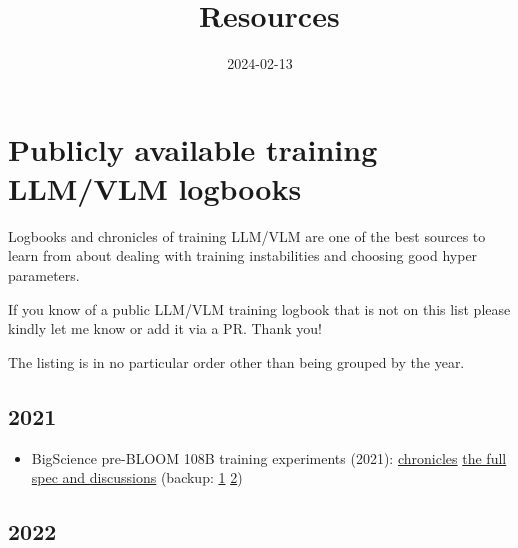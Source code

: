 \documentclass[
]{report}
\title{📓 Resources}
\author{}
\date{2024-02-13}
\providecommand{\tightlist}{%
  \setlength{\itemsep}{0pt}\setlength{\parskip}{0pt}}\usepackage{longtable,booktabs,array}
\begin{document}
\maketitle

\section{Publicly available training LLM/VLM
logbooks}\label{publicly-available-training-llmvlm-logbooks}

Logbooks and chronicles of training LLM/VLM are one of the best sources
to learn from about dealing with training instabilities and choosing
good hyper parameters.

If you know of a public LLM/VLM training logbook that is not on this
list please kindly let me know or add it via a PR. Thank you!

The listing is in no particular order other than being grouped by the
year.

\subsection{2021}\label{section}

\begin{itemize}
\tightlist
\item
  BigScience pre-BLOOM 108B training experiments (2021):
  \href{https://github.com/bigscience-workshop/bigscience/blob/master/train/tr8-104B-wide/chronicles.md}{chronicles}
  \textbar{}
  \href{https://github.com/bigscience-workshop/bigscience/blob/master/train/tr8-104B-wide}{the
  full spec and discussions} (backup:
  \href{https://github.com/stas00/bigscience-backup/blob/master/train/tr8-104B-wide/chronicles.md}{1}
  \textbar{}
  \href{https://github.com/stas00/bigscience-backup/blob/master/train/tr8-104B-wide}{2})
\end{itemize}

\subsection{2022}\label{section-1}
\end{document}
